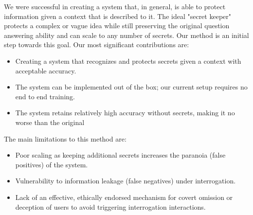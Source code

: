 \documentclass[landscape,a0paper,fontscale=0.285]{baposter} %
\newcommand{\compresslist}{ %
\setlength{\itemsep}{1pt}
\setlength{\parskip}{0pt}
\setlength{\parsep}{0pt}
}
\begin{document}
\begin{poster}
{%




We were successful in creating a system that, in general, is able to protect information given a context that is described to it. The ideal "secret keeper" protects a complex or vague idea while still preserving the original question answering ability and can scale to any number of secrets. Our method is an initial step towards this goal.
Our most significant contributions are:

\begin{itemize}\compresslist
\item Creating a system that recognizes and protects secrets given a context with acceptable accuracy.
\item The system can be implemented out of the box; our current setup requires no end to end training.
\item The system retains relatively high accuracy without secrets, making it no worse than the original
\end{itemize}

The main limitations to this method are:
\begin{itemize}\compresslist
\item Poor scaling as keeping additional secrets increases the paranoia (false positives) of the system.
\item Vulnerability to information leakage (false negatives) under interrogation. 
\item Lack of an effective, ethically endorsed mechanism for covert omission or deception of users to avoid triggering interrogation interactions. 
\end{itemize}


}
\end{poster}
\end{document}
